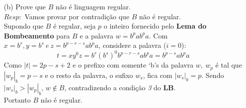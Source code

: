 \documentclass{homework}
\begin{document}
\pagebreak

	\begin{enumerate}
		\item[(b)] Prove que $B$ não é linguagem regular.\\
		$Resp:$ Vamos provar por contradição que $B$ não é regular.\\
			Supondo que $B$ é regular, seja $p$ o inteiro fornecido pelo \textbf{Lema do Bombeamento} para $B$ e a palavra $w = b^pab^pa$. Com $x = b^r, y = b^{s}\ e\ z = b^{p-r-s}ab^pa$, considere a palavra ($i = 0$):
			\[t = xy^0z = b^r(b^s)^0b^{p-r-s}ab^pa = b^{p-s}ab^pa\]
			Como $|t|=2p-s+2$ e o prefixo com somente `b's da palavra $w,\ w_p$ é tal que $|w_p|_b = p - s$ e o resto da palavra, o sufixo $w_s$, fica com $|w_s|_b = p$. Sendo $|w_s|_b > |w_p|_b$, $w \notin B$, contradizendo a condição \textit{3} do \textbf{LB}.\\
			Portanto $B$ não é regular.
	\end{enumerate}
	
\end{document}
